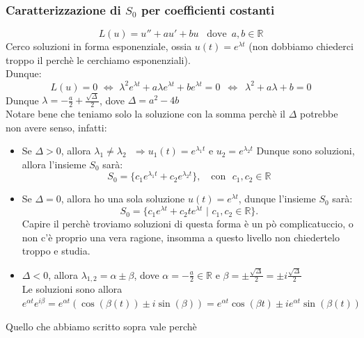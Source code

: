 \documentclass{article}
\theoremstyle{definition}
\newcommand{\R}{\mathbb{R}}
\begin{document}
\subsubsection{Caratterizzazione di $S_0$ per coefficienti costanti}
\begin{equation}
    L(u)=u''+au'+bu \,\,\,\,\, \mbox{dove}\,\,\, a,b \in \R
\end{equation}
Cerco soluzioni in forma esponenziale, ossia $u(t)=e^{\lambda t}$ (non dobbiamo chiederci troppo il perchè le cerchiamo esponenziali).
\\
Dunque:
\begin{equation}
    L(u)=0 \,\, \Longleftrightarrow \,\, \lambda^2 e^{\lambda t }+ a\lambda e ^{\lambda t}+be^{\lambda t}=0 \,\,\, \Longleftrightarrow \,\,\, \lambda^2+a\lambda + b =0
\end{equation}
Dunque $\lambda = -\frac{a}{2}+\frac{\sqrt{\Delta}}{2}$, dove $\Delta = a^2-4b$
\\
Notare bene che teniamo solo la soluzione con la somma perchè il $\Delta$ potrebbe non avere senso, infatti:
\begin{itemize}
    \item Se $\Delta > 0$, allora $\lambda_1 \neq \lambda_2 \,\,\,\, \Longrightarrow u_1(t)=e^{\lambda_1 t}$ e $u_2=e^{\lambda_2 t}$
Dunque sono soluzioni, allora l'insieme $S_0$ sarà:
\begin{equation}
    S_0=\{c_1e^{\lambda_1 t}+c_2e^{\lambda_2 t}\}, \,\,\,\,\,\, \mbox{con} \,\,\,\, c_1,c_2 \in \R
\end{equation}
\item Se $\Delta =0$, allora ho una sola soluzione $u(t)=e^{\lambda t}$, dunque l'insieme $S_0$ sarà:
\begin{equation}
    S_0=\{c_1e^{\lambda t}+c_2t e ^{\lambda t} \,\, | \,\, c_1,c_2 \in \R\}.
\end{equation}
Capire il perchè troviamo soluzioni di questa forma è un pò complicatuccio, o non c'è proprio una vera ragione, insomma a questo livello non chiedertelo troppo e studia.
\item $\Delta < 0$, allora $\lambda_{1,2}= \alpha \pm \beta$, dove $\alpha=-\frac{a}{2} \in \R$ e $\beta= \pm \frac{\sqrt{\Delta}}{2}= \pm i \frac{\sqrt{\Delta}}{2}$
\\
Le soluzioni sono allora $e^{\alpha t} e ^{i \beta }= e^{\alpha t} \left(\cos (\beta (t)) \pm i \sin (\beta) \right)= e^{\alpha t} \cos (\beta t) \pm i e^{\alpha t} \sin (\beta (t))$
\end{itemize}
Quello che abbiamo scritto sopra vale perchè
\end{document}
